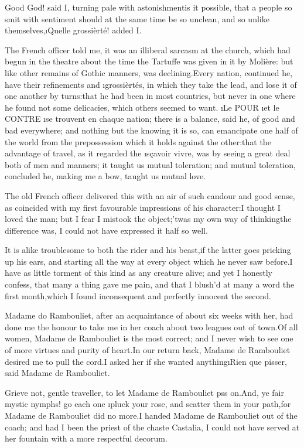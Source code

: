 \documentclass[twoside]{article}
\begin{document}
Good God! said I, turning pale with astonishment\tsk is it possible, that a
people so smit with sentiment should at the same time be so unclean, and
so unlike themselves,\tsk \i{Quelle grossièrté}! added I.

The French officer told me, it was an illiberal sarcasm at the church,
which had begun in the theatre about the time the Tartuffe was given in
it by Molière: but like other remains of Gothic manners, was
declining.\tsk Every nation, continued he, have their refinements and
\i{grossièrtés}, in which they take the lead, and lose it of one another by
turns:\tsk that he had been in most countries, but never in one where he
found not some delicacies, which others seemed to want.  \i{Le} POUR \i{et
le} CONTRE \i{se trouvent en chaque nation}; there is a balance, said he,
of good and bad everywhere; and nothing but the knowing it is so, can
emancipate one half of the world from the prepossession which it holds
against the other:\tsk that the advantage of travel, as it regarded the
\i{sçavoir vivre}, was by seeing a great deal both of men and manners; it
taught us mutual toleration; and mutual toleration, concluded he, making
me a bow, taught us mutual love.

The old French officer delivered this with an air of such candour and
good sense, as coincided with my first favourable impressions of his
character:\tsk I thought I loved the man; but I fear I mistook the
object;\tsk ’twas my own way of thinking\tsk the difference was, I could not have
expressed it half so well.

It is alike troublesome to both the rider and his beast,\tsk if the latter
goes pricking up his ears, and starting all the way at every object which
he never saw before.\tsk I have as little torment of this kind as any
creature alive; and yet I honestly confess, that many a thing gave me
pain, and that I blush’d at many a word the first month,\tsk which I found
inconsequent and perfectly innocent the second.

Madame do Rambouliet, after an acquaintance of about six weeks with her,
had done me the honour to take me in her coach about two leagues out of
town.\tsk Of all women, Madame de Rambouliet is the most correct; and I never
wish to see one of more virtues and purity of heart.\tsk In our return back,
Madame de Rambouliet desired me to pull the cord.\tsk I asked her if she
wanted anything\tsk \i{Rien que pisser}, said Madame de Rambouliet.

Grieve not, gentle traveller, to let Madame de Rambouliet p\tsk ss on.\tsk And,
ye fair mystic nymphs! go each one \i{pluck your rose}, and scatter them in
your path,\tsk for Madame de Rambouliet did no more.\tsk I handed Madame de
Rambouliet out of the coach; and had I been the priest of the chaste
Castalia, I could not have served at her fountain with a more respectful
decorum.
\end{document}
